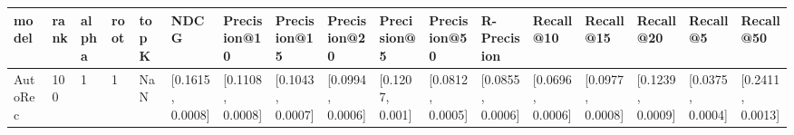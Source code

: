 \begin{tabular}{lllllllllllllllll}
\toprule
   model & rank & alpha & root & topK &              NDCG &      Precision@10 &      Precision@15 &      Precision@20 &      Precision@5 &      Precision@50 &       R-Precision &         Recall@10 &         Recall@15 &         Recall@20 &          Recall@5 &         Recall@50 \\
\midrule
 AutoRec &  100 &     1 &    1 &  NaN &  [0.1615, 0.0008] &  [0.1108, 0.0008] &  [0.1043, 0.0007] &  [0.0994, 0.0006] &  [0.1207, 0.001] &  [0.0812, 0.0005] &  [0.0855, 0.0006] &  [0.0696, 0.0006] &  [0.0977, 0.0008] &  [0.1239, 0.0009] &  [0.0375, 0.0004] &  [0.2411, 0.0013] \\
\bottomrule
\end{tabular}
